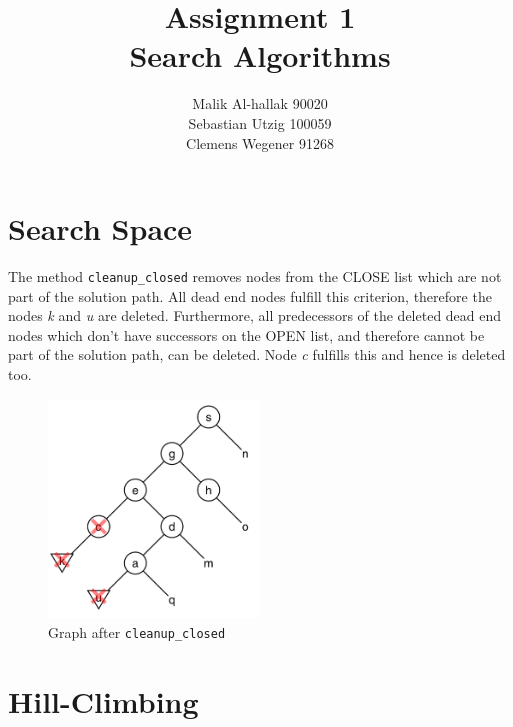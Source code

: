 \documentclass[11pt]{article}
\title{\textbf{Assignment 1\\}Search Algorithms}
\author{Malik Al-hallak 90020\\
		Sebastian Utzig 100059\\
		Clemens Wegener 91268}
\date{}
\begin{document}
\maketitle

\setcounter{section}{3} %
\section{Search Space}
The method \texttt{cleanup\_closed} removes nodes from the CLOSE list which are not part of the solution path. All dead end nodes fulfill this criterion, therefore the nodes \emph{k} and \emph{u} are deleted. Furthermore, all predecessors of the deleted dead end nodes which don't have successors on the OPEN list, and therefore cannot be part of the solution path, can be deleted. Node \emph{c} fulfills this and hence is deleted too.


\begin{figure}[ht]
	\centering
  \includegraphics[width=0.5\textwidth]{./graph_7.png}
  \caption{Graph after \texttt{cleanup\_closed}}
	\label{fig2}
\end{figure}

\setcounter{section}{6}
\section{Hill-Climbing}
\end{document}
